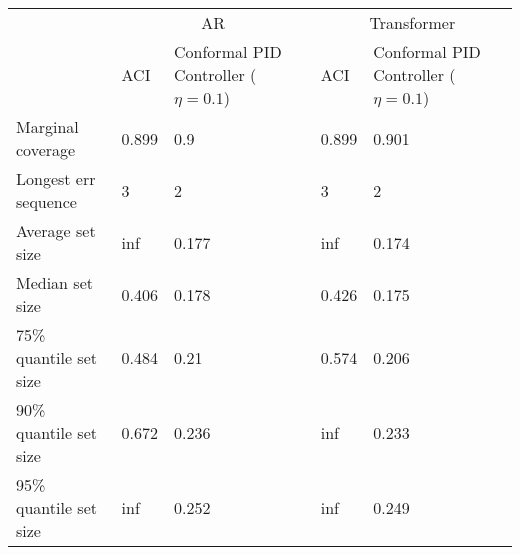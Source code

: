 \begin{tabular}{lllll}
\toprule
& \multicolumn{2}{c}{AR}& \multicolumn{2}{c}{Transformer} \\
& ACI & Conformal PID Controller ($\eta=0.1$) & ACI & Conformal PID Controller ($\eta=0.1$) \\
\midrule
Marginal coverage & 0.899 & 0.9 & 0.899 & 0.901 \\
Longest err sequence & 3 & 2 & 3 & 2 \\
Average set size & inf & 0.177 & inf & 0.174 \\
Median set size & 0.406 & 0.178 & 0.426 & 0.175 \\
75\% quantile set size & 0.484 & 0.21 & 0.574 & 0.206 \\
90\% quantile set size & 0.672 & 0.236 & inf & 0.233 \\
95\% quantile set size & inf & 0.252 & inf & 0.249 \\
\bottomrule
\end{tabular}
